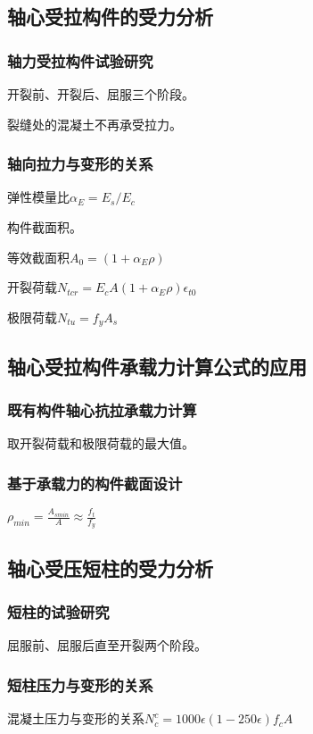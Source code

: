 \documentclass{article}
\begin{document}
\subsection{轴心受拉构件的受力分析}
\subsubsection{轴力受拉构件试验研究}
\par 开裂前、开裂后、屈服三个阶段。
\par 裂缝处的混凝土不再承受拉力。
\subsubsection{轴向拉力与变形的关系}
\par 弹性模量比$\alpha_E=E_s/E_c$
\par 构件截面积。
\par 等效截面积$A_0=(1+\alpha_E\rho)$
\par 开裂荷载$N_{tcr}=E_cA(1+\alpha_E\rho)\epsilon_{t0}$
\par 极限荷载$N_{tu}=f_yA_s$
\subsection{轴心受拉构件承载力计算公式的应用}
\subsubsection{既有构件轴心抗拉承载力计算}
\par 取开裂荷载和极限荷载的最大值。
\subsubsection{基于承载力的构件截面设计}
$\rho_{min} = \frac{A_{smin}}{A} \approx \frac{f_t}{f_y}$
\subsection{轴心受压短柱的受力分析}
\subsubsection{短柱的试验研究}
\par 屈服前、屈服后直至开裂两个阶段。
\subsubsection{短柱压力与变形的关系}
\par 混凝土压力与变形的关系$N_c^c=1000\epsilon(1-250\epsilon)f_cA$
\end{document}
